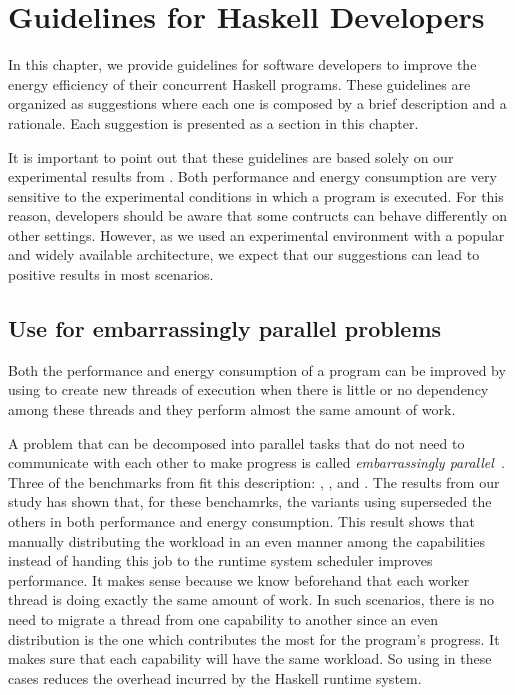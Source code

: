 \chapter{Guidelines for Haskell Developers}\label{chp:guide}
In this chapter, we provide guidelines for software developers to improve the energy efficiency of their concurrent Haskell programs. These guidelines are organized as suggestions where each one is composed by a brief description and a rationale. Each suggestion is presented as a section in this chapter.

It is important to point out that these guidelines are based solely on our experimental results from . Both performance and energy consumption are very sensitive to the experimental conditions in which a program is executed. For this reason, developers should be aware that some contructs can behave differently on other settings. However, as we used an experimental environment with a popular and widely available architecture, we expect that our suggestions can lead to positive results in most scenarios.


\section{Use \forkOn for embarrassingly parallel problems}
 Both the performance and energy consumption of a program can be improved by using \forkOn to create new threads of execution when there is little or no dependency among these threads and they perform almost the same amount of work.
\newline

 A problem that can be decomposed into parallel tasks that do not need to communicate with each other to make progress is called \emph{embarrassingly parallel}~\cite{herlihy:2012}. Three of the benchmarks from  fit this description: \mandelbrot, \regex, and \spectral. The results from our study has shown that, for these benchamrks, the variants using \forkOn superseded the others in both performance and energy consumption. This result shows that manually distributing the workload in an even manner among the capabilities instead of handing this job to the runtime system scheduler improves performance. It makes sense because we know beforehand that each worker thread is doing exactly the same amount of work. In such scenarios, there is no need to migrate a thread from one capability to another since an even distribution is the one which contributes the most for the program's progress. It makes sure that each capability will have the same workload. So using \forkOn in these cases reduces the overhead incurred by the Haskell runtime system.

